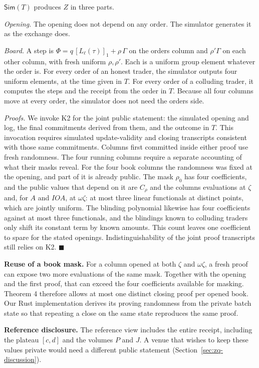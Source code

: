 \(\mathsf{Sim}(T)\) produces \(Z\) in three parts.

\emph{Opening.} The opening does not depend on any order. The simulator generates it as the exchange does.

\emph{Board.} A step is \(\Phi = q\,[L_\ell(\tau)]_1 + \rho\,\Gamma\) on the order\textquotesingle s column and \(\rho'\Gamma\) on each other column, with fresh uniform \(\rho, \rho'\). Each is a uniform group element whatever the order is. For every order of an honest trader, the simulator outputs four uniform elements, at the time given in \(T\). For every order of a colluding trader, it computes the steps and the receipt from the order in \(T\). Because all four columns move at every order, the simulator does not need the order\textquotesingle s side.

\emph{Proofs.} We invoke K2 for the joint public statement: the simulated opening and log, the final commitments derived from them, and the outcome in \(T\). This invocation requires simulated update-validity and closing transcripts consistent with those same commitments. Columns first committed inside either proof use fresh randomness. The four running columns require a separate accounting of what their masks reveal. For the four book columns the randomness was fixed at the opening, and part of it is already public. The mask \(\rho_0\) has four coefficients, and the public values that depend on it are \(C_\rho\) and the column\textquotesingle s evaluations at \(\zeta\) and, for \(A\) and \(IOA\), at \(\omega\zeta\): at most three linear functionals at distinct points, which are jointly uniform. The blinding polynomial likewise has four coefficients against at most three functionals, and the blindings known to colluding traders only shift its constant term by known amounts. This count leaves one coefficient to spare for the stated openings. Indistinguishability of the joint proof transcripts still relies on K2. \(\blacksquare\)

\textbf{Reuse of a book mask.} For a column opened at both \(\zeta\) and \(\omega\zeta\), a fresh proof can expose two more evaluations of the same mask. Together with the opening and the first proof, that can exceed the four coefficients available for masking. Theorem 4 therefore allows at most one distinct closing proof per opened book. Our Rust implementation derives its proving randomness from the private batch state so that repeating a close on the same state reproduces the same proof.

\textbf{Reference disclosure.} The reference view includes the entire receipt, including the plateau \([c,d]\) and the volumes \(P\) and \(J\). A venue that wishes to keep these values private would need a different public statement (Section~\ref{sec:zq-discussion}).

